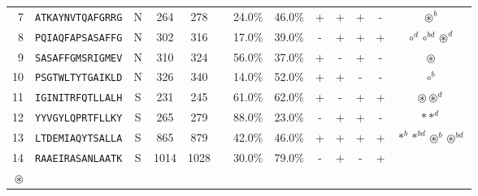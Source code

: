 \begin{tabular}{rcccccccccccc}
7  &  \texttt{ATKAYNVTQAFGRRG} &       N &    264 &   278 &                &                          24.0\% &                           46.0\% &          + &           + &          + &           - &                                                                                     $ \circledast^b $ \\
8  &  \texttt{PQIAQFAPSASAFFG} &       N &    302 &   316 &                &                          17.0\% &                           39.0\% &          - &           + &          + &           + &                                                                  $ \circ^d \circ^{bd} \circledast^d $ \\
9  &  \texttt{SASAFFGMSRIGMEV} &       N &    310 &   324 &                &                          56.0\% &                           37.0\% &          + &           - &          + &           - &                                                                                       $ \circledast $ \\
10 &  \texttt{PSGTWLTYTGAIKLD} &       N &    326 &   340 &                &                          14.0\% &                           52.0\% &          + &           + &          - &           - &                                                                                           $ \circ^b $ \\
11 &  \texttt{IGINITRFQTLLALH} &       S &    231 &   245 &                &                          61.0\% &                           62.0\% &          + &           - &          + &           + &                                                                         $ \circledast \circledast^d $ \\
12 &  \texttt{YYVGYLQPRTFLLKY} &       S &    265 &   279 &                &                          88.0\% &                           23.0\% &          - &           + &          + &           - &                                                                                       $ \ast \ast^d $ \\
13 &  \texttt{LTDEMIAQYTSALLA} &       S &    865 &   879 &                &                          42.0\% &                           46.0\% &          + &           + &          + &           + &                                                   $ \ast^b \ast^{bd} \circledast^b \circledast^{bd} $ \\
14 &  \texttt{RAAEIRASANLAATK} &       S &   1014 &  1028 &                &                          30.0\% &                           79.0\% &          - &           + &          - &           + &                                 \Centerstack{  $\circ \circ^b \circ^d \circ^{bd}$ \\  $\circledast$ } \\

\end{tabular}
